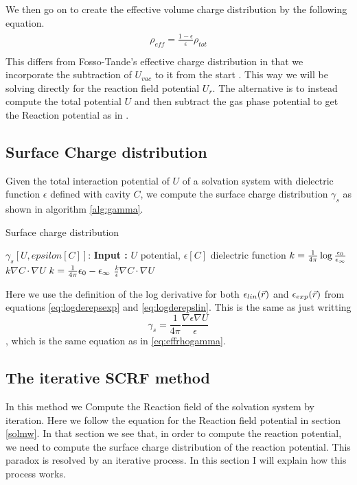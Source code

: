 \documentclass[../master_thesis.tex]{subfiles}
\begin{document}
We then go on to create the effective volume charge distribution by the following equation.
\begin{align}
    \begin{split}
      \rho_{eff} = \frac{1 - \epsilon}{\epsilon}\rho_{tot}\\
    \end{split}
\end{align}
This differs from Fosso-Tande's effective charge distribution in that we incorporate
the subtraction of $U_{vac}$ to it from the start \cite{FossoTande:2013ka}. This
way we will be solving directly for the reaction field potential $U_r$.
The alternative is to instead compute the total potential $U$ and then subtract
the gas phase potential to get the Reaction potential as in \cite{FossoTande:2013ka}.

\subsection{Surface Charge distribution}
Given the total interaction potential of $U$ of a solvation system with
dielectric function $\epsilon$ defined with cavity $C$, we compute the surface charge distribution
$\gamma_s$ as shown in algorithm \ref{alg:gamma}.
\begin{algorithm}
  \caption{Surface charge distribution}\label{alg:gamma}
  \begin{algorithmic}
    \STATE $\gamma_s[U, epsilon[C]]$:
    \STATE \textbf{Input :} $U$ potential, $\epsilon[C]$ dielectric function
      \STATE $k = \frac{1}{4\pi}\log\frac{\epsilon_{0}}{\epsilon_{\infty}}$
      \RETURN $k \nabla C \cdot \nabla U$
      \STATE $k = \frac{1}{4\pi}\epsilon_{0}-\epsilon_{\infty}$
      \RETURN $\frac{k}{\epsilon} \nabla C \cdot \nabla U$
    \ENDIF
  \end{algorithmic}
\end{algorithm}

Here we use the definition of the log derivative for both $\epsilon_{lin}(\vec{r})$ and $\epsilon_{exp}(\vec{r})$
from equations \ref{eq:logderepsexp} and \ref{eq:logderepslin}. This is the same
as just writting $$\gamma_s = \frac{1}{4\pi}\frac{\nabla\epsilon\nabla U}{\epsilon}$$,
which is the same equation as in \ref{eq:effrhogamma}.

\subsection{The iterative \ac{SCRF} method}
In this method we Compute the Reaction field of the solvation system by iteration.
Here we follow the equation for the Reaction field potential in section \ref{solmw}.
In that section we see that, in order to compute the reaction potential, we need
to compute the surface charge distribution of the reaction potential. This
paradox is resolved by an iterative process. In this section I will explain how
this process works.
\end{document}
